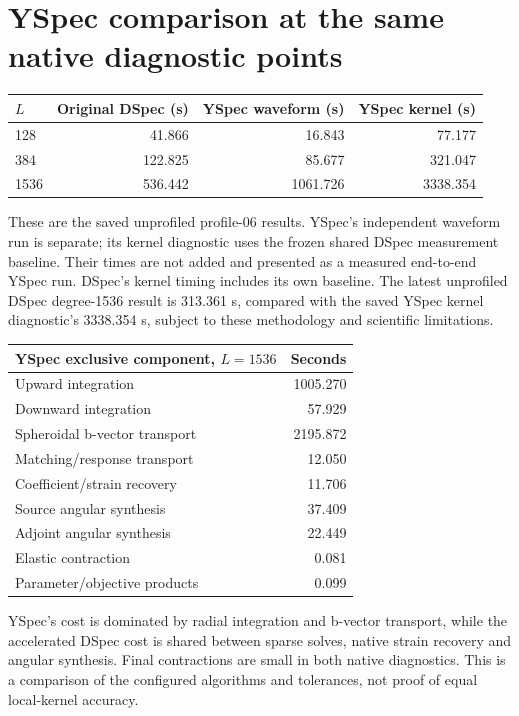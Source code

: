 \documentclass[11pt,a4paper]{article}
\begin{document}
\section{YSpec comparison at the same native diagnostic points}
\begin{center}
\small
\begin{tabular}{lrrr}
\toprule
$L$ & Original DSpec (s) & YSpec waveform (s) & YSpec kernel (s) \\
\midrule
128 & 41.866 & 16.843 & 77.177 \\
384 & 122.825 & 85.677 & 321.047 \\
1536 & 536.442 & 1061.726 & 3338.354 \\
\bottomrule
\end{tabular}
\end{center}
These are the saved unprofiled profile-06 results. YSpec's independent waveform run is separate; its kernel diagnostic uses the frozen shared DSpec measurement baseline. Their times are not added and presented as a measured end-to-end YSpec run. DSpec's kernel timing includes its own baseline. The latest unprofiled DSpec degree-1536 result is 313.361 s, compared with the saved YSpec kernel diagnostic's 3338.354 s, subject to these methodology and scientific limitations.

\begin{center}
\small
\begin{tabular}{p{11cm}r}
\toprule
YSpec exclusive component, $L=1536$ & Seconds \\
\midrule
Upward integration & 1005.270 \\
Downward integration & 57.929 \\
Spheroidal b-vector transport & 2195.872 \\
Matching/response transport & 12.050 \\
Coefficient/strain recovery & 11.706 \\
Source angular synthesis & 37.409 \\
Adjoint angular synthesis & 22.449 \\
Elastic contraction & 0.081 \\
Parameter/objective products & 0.099 \\
\bottomrule
\end{tabular}
\end{center}
YSpec's cost is dominated by radial integration and b-vector transport, while the accelerated DSpec cost is shared between sparse solves, native strain recovery and angular synthesis. Final contractions are small in both native diagnostics. This is a comparison of the configured algorithms and tolerances, not proof of equal local-kernel accuracy.
\end{document}
